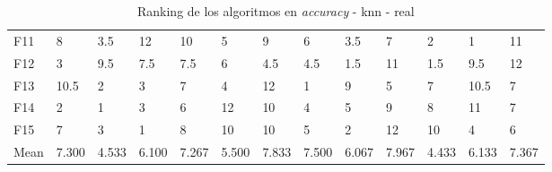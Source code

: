 \begin{table}
\begin{adjustbox}{width=\linewidth}
\begin{tabular}{lllllllllllll}
            F11  & 8     & 3.5   & 12    & 10    & 5     & 9     & 6     & 3.5   & 7     & 2     & 1     & 11    \\
            F12  & 3     & 9.5   & 7.5   & 7.5   & 6     & 4.5   & 4.5   & 1.5   & 11    & 1.5   & 9.5   & 12    \\
            F13  & 10.5  & 2     & 3     & 7     & 4     & 12    & 1     & 9     & 5     & 7     & 10.5  & 7     \\
            F14  & 2     & 1     & 3     & 6     & 12    & 10    & 4     & 5     & 9     & 8     & 11    & 7     \\
            F15  & 7     & 3     & 1     & 8     & 10    & 10    & 5     & 2     & 12    & 10    & 4     & 6     \\
            Mean & 7.300 & 4.533 & 6.100 & 7.267 & 5.500 & 7.833 & 7.500 & 6.067 & 7.967 & 4.433 & 6.133 & 7.367 \\
            \bottomrule
        \end{tabular}
    \end{adjustbox}
    \caption{Ranking de los algoritmos en \textit{accuracy} - knn - real}
    \label{tab:ranking_accuracy_real_knn}
\end{table}

